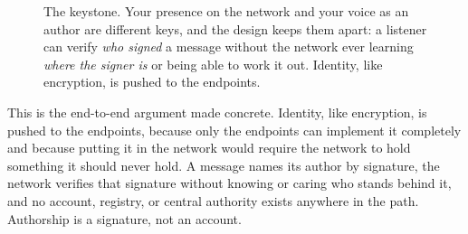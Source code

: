 \documentclass[nobib,justified]{tufte-handout}
\begin{document}
\begin{figure}[h]
\centering
{}
\caption[Two identities]{The keystone. Your presence on the network and your
voice as an author are different keys, and the design keeps them apart: a
listener can verify \emph{who signed} a message without the network ever
learning \emph{where the signer is} or being able to work it out. Identity, like
encryption, is pushed to the endpoints.}
\label{fig:identity}
\end{figure}

This is the end-to-end argument made concrete. Identity, like encryption, is
pushed to the endpoints, because only the endpoints can implement it completely
and because putting it in the network would require the network to hold
something it should never hold. A message names its author by signature, the
network verifies that signature without knowing or caring who stands behind it,
and no account, registry, or central authority exists anywhere in the path.
Authorship is a signature, not an account.
\end{document}
